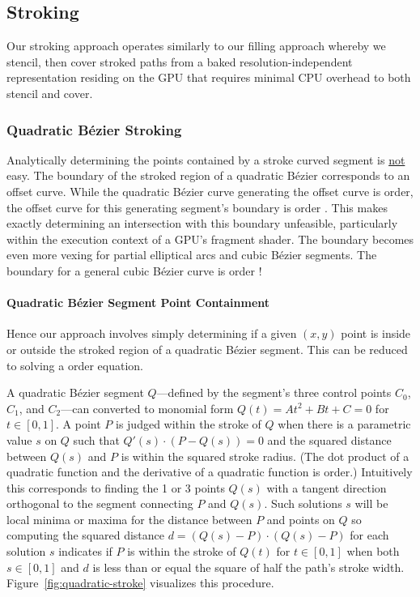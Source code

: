 \subsection{Stroking}

Our stroking approach operates similarly to our filling approach whereby
we stencil, then cover stroked paths from a baked resolution-independent
representation residing on the GPU that requires minimal CPU overhead
to both stencil and cover.

\subsubsection{Quadratic B\'{e}zier Stroking}

Analytically determining the points contained by a stroke curved
segment is \underline{not} easy.  The boundary of the stroked region
of a quadratic B\'{e}zier corresponds to an offset curve.  While the
quadratic B\'{e}zier curve generating the offset curve is  order,
the offset curve for this generating segment's boundary is  order
\cite{Salmon}.  This makes exactly determining an intersection with
this boundary unfeasible, particularly within the execution context
of a GPU's fragment shader.  The boundary becomes even more vexing for
partial elliptical arcs and cubic B\'{e}zier segments.  The boundary for
a general cubic B\'{e}zier curve is  order \cite{Farouki1990101}!

\paragraph{Quadratic B\'{e}zier Segment Point Containment}

Hence our approach involves simply determining if a given $(x,y)$ point is
inside or outside the stroked region of a quadratic B\'{e}zier segment.
This can be reduced to solving a  order equation.

A quadratic B\'{e}zier segment $Q$---defined by the segment's three
control points $C_0$, $C_1$, and $C_2$---can converted to monomial
form $Q(t)=At^{2}+Bt+C=0$ for $t \in [0,1]$.  A point $P$ is judged
within the stroke of $Q$ when there is a parametric value $s$ on $Q$
such that $Q'(s) \cdot (P-Q(s))=0$ and the squared distance between $Q(s)$ and
$P$ is within the squared stroke radius.  (The dot product of a quadratic
function and the derivative of a quadratic function is  order.)
Intuitively this corresponds to finding the 1 or 3 points $Q(s)$ with
a tangent direction orthogonal to the segment connecting $P$ and $Q(s)$.
Such solutions $s$ will be local minima or maxima for the distance between
$P$ and points on $Q$ so computing the squared distance $d=(Q(s)-P) \cdot
(Q(s)-P)$ for each solution $s$ indicates if $P$ is within the stroke of
$Q(t)$ for $t \in [0,1]$ when both $s \in [0,1]$ and $d$ is less than or
equal the square of half the path's stroke width.  Figure~\ref{fig:quadratic-stroke} visualizes this procedure.

